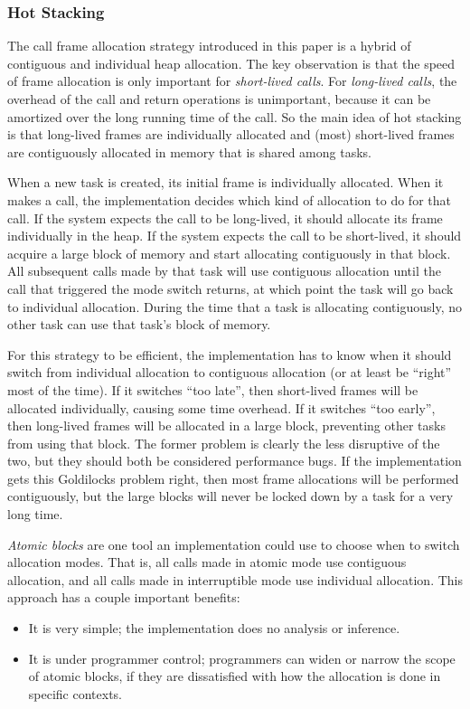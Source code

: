 \documentclass[acmsmall,anonymous,review]{acmart}\settopmatter{printfolios=true,printccs=false,printacmref=false}
\begin{document}
\subsubsection{Hot Stacking}

The call frame allocation strategy introduced in this paper is a hybrid of contiguous and individual heap allocation.
The key observation is that the speed of frame allocation is only important for \emph{short-lived calls}.
For \emph{long-lived calls}, the overhead of the call and return operations is unimportant, because it can be amortized over the long running time of the call.
So the main idea of hot stacking is that long-lived frames are individually allocated and (most) short-lived frames are contiguously allocated in memory that is shared among tasks.

When a new task is created, its initial frame is individually allocated.
When it makes a call, the implementation decides which kind of allocation to do for that call.
If the system expects the call to be long-lived, it should allocate its frame individually in the heap.
If the system expects the call to be short-lived, it should acquire a large block of memory and start allocating contiguously in that block.
All subsequent calls made by that task will use contiguous allocation until the call that triggered the mode switch returns, at which point the task will go back to individual allocation.
During the time that a task is allocating contiguously, no other task can use that task's block of memory.

For this strategy to be efficient, the implementation has to know when it should switch from individual allocation to contiguous allocation (or at least be ``right'' most of the time).
If it switches ``too late'', then short-lived frames will be allocated individually, causing some time overhead.
If it switches ``too early'', then long-lived frames will be allocated in a large block, preventing other tasks from using that block.
The former problem is clearly the less disruptive of the two, but they should both be considered performance bugs.
If the implementation gets this Goldilocks problem right, then most frame allocations will be performed contiguously, but the large blocks will never be locked down by a task for a very long time.

\emph{Atomic blocks} are one tool an implementation could use to choose when to switch allocation modes.
That is, all calls made in atomic mode use contiguous allocation, and all calls made in interruptible mode use individual allocation.
This approach has a couple important benefits:
\begin{itemize}
\item It is very simple; the implementation does no analysis or inference.
\item It is under programmer control; programmers can widen or narrow the scope of atomic blocks, if they are dissatisfied with how the allocation is done in specific contexts.
\end{itemize}
\end{document}
